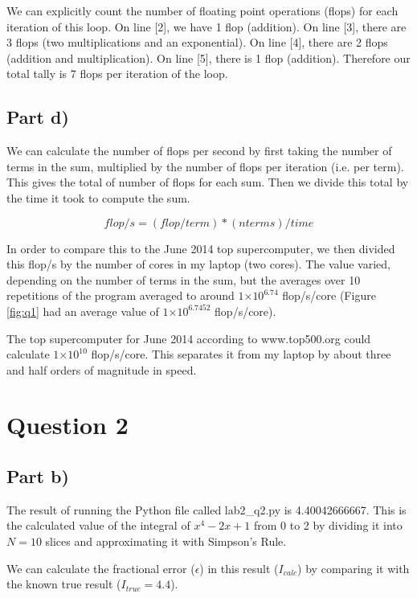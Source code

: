 \documentclass[a4paper,12pt]{article}
\providecommand{\e}[1]{\ensuremath{\times 10^{#1}}}
\begin{document}
We can explicitly count the number of floating point operations (flops) for each iteration of this loop. On line [2], we have 1 flop (addition). On line [3], there are 3 flops (two multiplications and an exponential). On line [4], there are 2 flops (addition and multiplication). On line [5], there is 1 flop (addition). Therefore our total tally is 7 flops per iteration of the loop.

\subsection{Part d)}

We can calculate the number of flops per second by first taking the number of terms in the sum, multiplied by the number of flops per iteration (i.e. per term). This gives the total of number of flops for each sum. Then we divide this total by the time it took to compute the sum.

\begin{equation}
flop/s = (flop/term)*(nterms)/time\nonumber
\end{equation}

In order to compare this to the June 2014 top supercomputer, we then divided this flop/s by the number of cores in my laptop (two cores). The value varied, depending on the number of terms in the sum, but the averages over 10 repetitions of the program averaged to around $1\e{6.74}$ flop/s/core (Figure \ref{fig:q1} had an average value of $1\e{6.7452}$ flop/s/core).

The top supercomputer for June 2014 according to www.top500.org could calculate $1\e{10}$ flop/s/core. This separates it from my laptop by about three and half orders of magnitude in speed.

\section{Question 2}
\subsection{Part b)}

The result of running the Python file called lab2\_q2.py is 4.40042666667. This is the calculated value of the integral of $x^4 - 2x + 1$ from 0 to 2 by dividing it into $N=10$ slices and approximating it with Simpson's Rule.

We can calculate the fractional error ($\epsilon$) in this result ($I_{calc}$) by comparing it with the known true result ($I_{true} = 4.4$).
\end{document}
